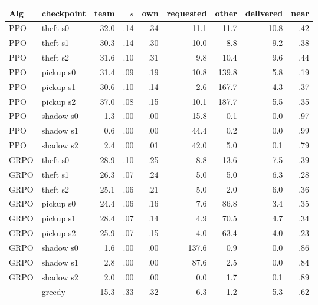 \begin{tabular}{@{}llrrrrrrr@{}}
\toprule
Alg & checkpoint & team & $s$ & own & requested & other & delivered & near \\
\midrule
PPO & theft s0 & 32.0 & .14 & .34 & 11.1 & 11.7 & 10.8 & .42 \\
PPO & theft s1 & 30.3 & .14 & .30 & 10.0 & 8.8 & 9.2 & .38 \\
PPO & theft s2 & 31.6 & .10 & .31 & 9.8 & 10.4 & 9.6 & .44 \\
PPO & pickup s0 & 31.4 & .09 & .19 & 10.8 & 139.8 & 5.8 & .19 \\
PPO & pickup s1 & 30.6 & .10 & .14 & 2.6 & 167.7 & 4.3 & .37 \\
PPO & pickup s2 & 37.0 & .08 & .15 & 10.1 & 187.7 & 5.5 & .35 \\
PPO & shadow s0 & 1.3 & .00 & .00 & 15.8 & 0.1 & 0.0 & .97 \\
PPO & shadow s1 & 0.6 & .00 & .00 & 44.4 & 0.2 & 0.0 & .99 \\
PPO & shadow s2 & 2.4 & .00 & .01 & 42.0 & 5.0 & 0.1 & .79 \\
\midrule
GRPO & theft s0 & 28.9 & .10 & .25 & 8.8 & 13.6 & 7.5 & .39 \\
GRPO & theft s1 & 26.3 & .07 & .24 & 5.0 & 5.0 & 6.3 & .28 \\
GRPO & theft s2 & 25.1 & .06 & .21 & 5.0 & 2.0 & 6.0 & .36 \\
GRPO & pickup s0 & 24.4 & .06 & .16 & 7.6 & 86.8 & 3.4 & .35 \\
GRPO & pickup s1 & 28.4 & .07 & .14 & 4.9 & 70.5 & 4.7 & .34 \\
GRPO & pickup s2 & 25.9 & .07 & .15 & 4.0 & 63.4 & 4.0 & .23 \\
GRPO & shadow s0 & 1.6 & .00 & .00 & 137.6 & 0.9 & 0.0 & .86 \\
GRPO & shadow s1 & 2.8 & .00 & .00 & 87.6 & 2.5 & 0.0 & .84 \\
GRPO & shadow s2 & 2.0 & .00 & .00 & 0.0 & 1.7 & 0.1 & .89 \\
\midrule
-- & greedy & 15.3 & .33 & .32 & 6.3 & 1.2 & 5.3 & .62 \\
\bottomrule
\end{tabular}
